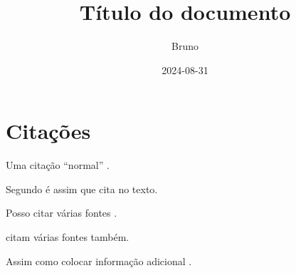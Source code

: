 \documentclass[dsc,male,12pt,a4paper]{ita}
\title{Título do documento}
\author{Bruno}
\date{2024-08-31}
\begin{document}
\frontmatter
\maketitle
\makecip

\tableofcontents

\mainmatter
\chapter{Citações}
Uma citação ``normal'' \cite{silvaBIM4DNo2019}.

Segundo \textcite{dynamoDynamoBIM} é assim que cita no texto.

Posso citar várias fontes \cites{nrelEnergyPlus2024,ronzaniEstudoITAPara2020}.

\textcites{wenProgressTrendBIM2021,autodeskNavisworks3DModel2024} citam várias fontes também.

Assim como colocar informação adicional \cite[pre][post]{pauwelsIFCtoRDF2024}.

\printbibliography
\end{document}
